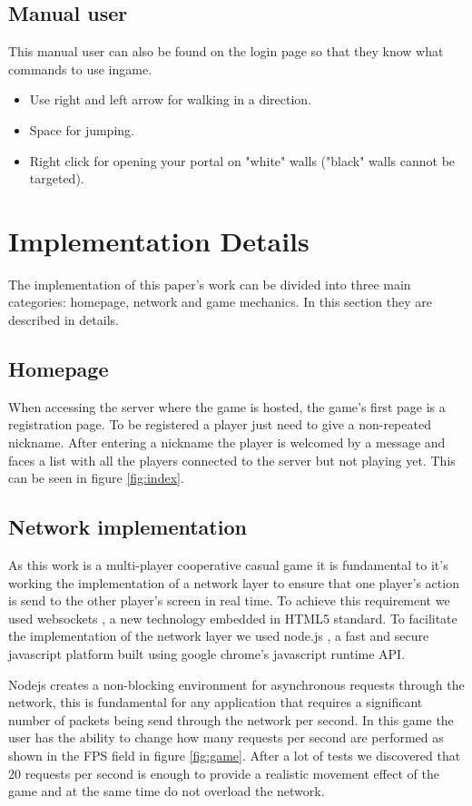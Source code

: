 \documentclass{chi-ext}
\begin{document}
\subsection{Manual user}
This manual user can also be found on the login page so that they know what commands to use ingame.
\begin{itemize}
\item Use right and left arrow for walking in a direction.
\item Space for jumping.
\item Right click for opening your portal on "white" walls ("black" walls cannot be targeted).
\end{itemize}

\section{Implementation Details}
The implementation of this paper's work can be divided into three main categories: homepage, network and game mechanics. In this section they are described in details.

\subsection{Homepage}
When accessing the server where the game is hosted, the game's first page is a registration page. To be registered a player just need to give a non-repeated nickname. After entering a nickname the player is welcomed by a message and faces a list with all the players connected to the server but not playing yet. This can be seen in figure \ref{fig:index}.

\subsection{Network implementation}
As this work is a multi-player cooperative casual game it is fundamental to it's working the implementation of a network layer to ensure that one player's action is send to the other player's screen in real time. To achieve this requirement we used websockets \cite{websockets}, a new technology embedded in HTML5 standard. To facilitate the implementation of the network layer we used node.js \cite{nodejs}, a fast and secure javascript platform built using google chrome's javascript runtime API.

Nodejs creates a non-blocking environment for asynchronous requests through the network, this is fundamental for any application that requires a significant number of packets being send through the network per second. In this game the user has the ability to change how many requests per second are performed as shown in the FPS field in figure \ref{fig:game}. After a lot of tests we discovered that 20 requests per second is enough to provide a realistic movement effect of the game and at the same time do not overload the network.
\end{document}
